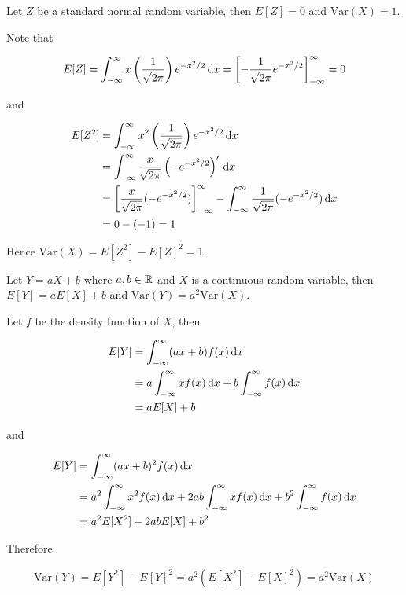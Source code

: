 \documentclass[a4paper,12pt]{article}
\begin{document}
\begin{pst}
  Let $Z$ be a standard normal random variable, then $E[Z]=0$ and $\mathrm{Var}(X)=1$.\n
  
  \prf Note that

  $$E[Z]=\int_{-\infty}^{\infty}x\left( \frac{1}{\sqrt{2\pi}}\right)e^{-x^{2}/2}\,\mathrm{d} x=\left[ -\frac{1}{\sqrt{2\pi}}e^{-x^{2}/2}\right]_{-\infty}^{\infty}=0$$\s

  and

  $$\begin{aligned}[t]
    E[Z^{2}]&=\int_{-\infty}^{\infty}x^{2}\left( \frac{1}{\sqrt{2\pi}}\right)e^{-x^{2}/2}\,\mathrm{d} x\\
    &=\int_{-\infty}^{\infty}\frac{x}{\sqrt{2\pi}}\left( -e^{-x^{2}/2}\right)'\,\mathrm{d} x\\
    &=\left[ \frac{x}{\sqrt{2\pi}}(-e^{-x^{2}/2})\right]_{-\infty}^{\infty}-\int_{-\infty}^{\infty}\frac{1}{\sqrt{2\pi}}(-e^{-x^{2}/2})\,\mathrm{d} x\\
    &=0-(-1)=1
  \end{aligned}$$\s

  Hence $\mathrm{Var}(X)=E[Z^{2}]-E[Z]^{2}=1$.
\end{pst}\n

\begin{pst}
  Let $Y=aX+b$ where $a,b\in\mathbb{R}$ and $X$ is a continuous random variable, then $E[Y]=aE[X]+b$ and $\mathrm{Var}(Y)=a^{2}\mathrm{Var}(X)$.\n

  \prf Let $f$ be the density function of $X$, then

  $$\begin{aligned}[t]
    E[Y]&=\int_{-\infty}^{\infty}(ax+b)f(x)\,\mathrm{d} x\\
    &=a\int_{-\infty}^{\infty}xf(x)\,\mathrm{d} x+b\int_{-\infty}^{\infty}f(x)\,\mathrm{d} x\\
    &=aE[X]+b
  \end{aligned}$$\s

  and

  $$\begin{aligned}[t]
    E[Y]&=\int_{-\infty}^{\infty}(ax+b)^{2}f(x)\,\mathrm{d} x\\
    &=a^{2}\int_{-\infty}^{\infty}x^{2}f(x)\,\mathrm{d} x+2ab\int_{-\infty}^{\infty}xf(x)\,\mathrm{d} x+b^{2}\int_{-\infty}^{\infty}f(x)\,\mathrm{d} x\\
    &=a^{2}E[X^{2}]+2abE[X]+b^{2}
  \end{aligned}$$\s

  Therefore

  $$\mathrm{Var}(Y)=E[Y^{2}]-E[Y]^{2}=a^{2}(E[X^{2}]-E[X]^{2})=a^{2}\mathrm{Var}(X)$$
\end{pst}\n
\end{document}
